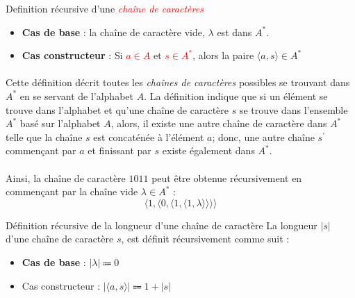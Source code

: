 \documentclass[16pt]{report}
\begin{document}
\begin{multicols*}{2}
\begin{Definitionx}{Definition récursive d'une \textit{\textcolor{red}{chaîne de caractères}}}{}
                    \begin{itemize}
                        \item \textbf{Cas de base} : la chaîne de caractère vide, $\lambda$ est dans $A^*$. 
                        \item \textbf{Cas constructeur} : Si \textcolor{red}{$a \in A$} et 
                            \textcolor{red}{$s \in A^*$}, alors la paire $\langle{a, s}\rangle \in A^*$     
                    \end{itemize} 
            \end{Definitionx}    

            \paragraph{}
                Cette définition décrit toutes les \textit{chaînes de caractères} possibles se trouvant dans $A^*$ en se 
                servant de l'alphabet $A$. La définition indique que si un élément se trouve dans l'alphabet et 
                qu'une chaîne de caractère $s$ se trouve dans l'ensemble $A^*$ basé sur l'alphabet $A$, alors, 
                il existe une autre chaîne de caractère dans $A^*$ telle que la chaîne $s$ est concaténée à 
                l'élément $a$; donc, une autre chaîne $s^{\prime}$ commençant par $a$ et finissant par $s$ existe 
                également dans $A^*$. 

            \paragraph{}
                Ainsi, la chaîne de caractère $1011$ peut être obtenue récursivement en commençant par la chaîne 
                vide $\lambda \in A^*$ : 
                \[ \langle 1, \langle 0, \langle 1, \langle 1, \lambda \rangle\rangle\rangle\rangle \]


            \begin{Definitionx}{Définition récursive de la longueur d'une chaîne de caractère}{}
                La longueur $|s|$ d'une chaîne de caractère $s$, est définit récursivement comme suit :
                        \begin{itemize}
                            \item \textbf{Cas de base} : $|\lambda| \Coloneqq 0$
                            \item Cas constructeur : $|\langle a, s \rangle| \Coloneqq 1 + |s|$ 
                        \end{itemize}
            \end{Definitionx}



\end{multicols*}
\end{document}
